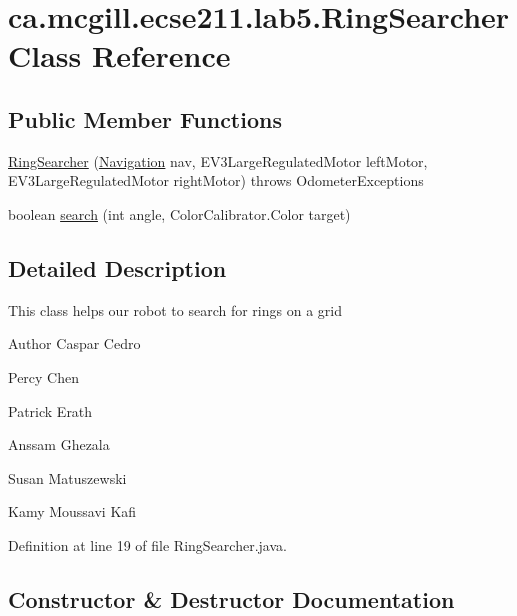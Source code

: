 \hypertarget{classca_1_1mcgill_1_1ecse211_1_1lab5_1_1_ring_searcher}{}\section{ca.\+mcgill.\+ecse211.\+lab5.\+Ring\+Searcher Class Reference}
\label{classca_1_1mcgill_1_1ecse211_1_1lab5_1_1_ring_searcher}
\subsection*{Public Member Functions}
\begin{DoxyCompactItemize}
\item 
\hyperlink{classca_1_1mcgill_1_1ecse211_1_1lab5_1_1_ring_searcher_aa3f2d76984b3b80f32b6ddd6770e24b0}{Ring\+Searcher} (\hyperlink{classca_1_1mcgill_1_1ecse211_1_1lab5_1_1_navigation}{Navigation} nav, E\+V3\+Large\+Regulated\+Motor left\+Motor, E\+V3\+Large\+Regulated\+Motor right\+Motor)  throws Odometer\+Exceptions 
\item 
boolean \hyperlink{classca_1_1mcgill_1_1ecse211_1_1lab5_1_1_ring_searcher_a88a4c77f3c76d74edc8bfd0229f0902f}{search} (int angle, Color\+Calibrator.\+Color target)
\end{DoxyCompactItemize}


\subsection{Detailed Description}
This class helps our robot to search for rings on a grid

\begin{DoxyAuthor}{Author}
Caspar Cedro 

Percy Chen 

Patrick Erath 

Anssam Ghezala 

Susan Matuszewski 

Kamy Moussavi Kafi 
\end{DoxyAuthor}


Definition at line 19 of file Ring\+Searcher.\+java.



\subsection{Constructor \& Destructor Documentation}
\mbox{\label{classca_1_1mcgill_1_1ecse211_1_1lab5_1_1_ring_searcher_aa3f2d76984b3b80f32b6ddd6770e24b0}} 
